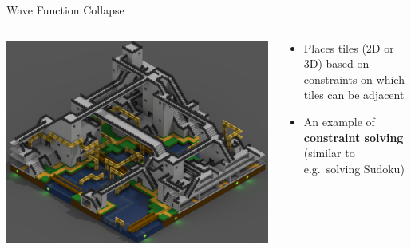 \begin{frame}{Wave Function Collapse}
	\begin{columns}
		\begin{column}{0.4\textwidth}
			\includegraphics[width=\textwidth]{wfc}
		\end{column}
		\begin{column}{0.55\textwidth}
			\begin{itemize}
                \pause\item Places tiles (2D or 3D) based on constraints on which tiles can be adjacent
                \pause\item An example of \textbf{constraint solving} (similar to e.g.\ solving Sudoku)
			\end{itemize}
		\end{column}
	\end{columns}
\end{frame}

